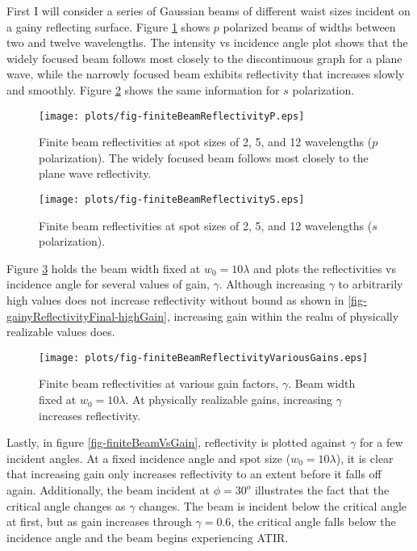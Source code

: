 \documentclass[12pt]{uthesis-v12}
\begin{document}
First I will consider a series of Gaussian beams of different waist sizes incident on a gainy reflecting surface. Figure \ref{fig-finiteBeamReflectivityP} shows $p$ polarized beams of widths between two and twelve wavelengths. The intensity vs incidence angle plot shows that the widely focused beam follows most closely to the discontinuous graph for a plane wave, while the narrowly focused beam exhibits reflectivity that increases slowly and smoothly. Figure \ref{fig-finiteBeamReflectivityS} shows the same information for $s$ polarization.

\begin{figure}[htb]
\centering
\texttt{[image: plots/fig-finiteBeamReflectivityP.eps]}
\caption[Finite Beam Reflectivities at various spot sizes ($p$-polarization)]{Finite beam reflectivities at spot sizes of 2, 5, and 12 wavelengths ($p$ polarization). The widely focused beam follows most closely to the plane wave reflectivity.
 \label{fig-finiteBeamReflectivityP}}
\end{figure}

\begin{figure}
\centering
\texttt{[image: plots/fig-finiteBeamReflectivityS.eps]}
\caption[Finite Beam Reflectivities at various spot sizes ($s$-polarization)]{Finite beam reflectivities at spot sizes of 2, 5, and 12 wavelengths ($s$ polarization).
 \label{fig-finiteBeamReflectivityS}}
\end{figure}

Figure \ref{fig-finiteBeamReflectivityVariousGains} holds the beam width fixed at $w_0=10\lambda$ and plots the reflectivities vs incidence angle for several values of gain, $\gamma$. Although increasing $\gamma$ to arbitrarily high values does not increase reflectivity without bound as shown in \ref{fig-gainyReflectivityFinal-highGain}, increasing gain within the realm of physically realizable values does.

\begin{figure}
\centering
\texttt{[image: plots/fig-finiteBeamReflectivityVariousGains.eps]}
\caption[Finite Beam Reflectivities at Various Gain Factors]{Finite beam reflectivities at various gain factors, $\gamma$. Beam width fixed at $w_0=10\lambda$. At physically realizable gains, increasing $\gamma$ increases reflectivity.
 \label{fig-finiteBeamReflectivityVariousGains}}
\end{figure}

Lastly, in figure \ref{fig-finiteBeamVsGain}, reflectivity is plotted against $\gamma$ for a few incident angles. At a fixed incidence angle and spot size ($w_0=10\lambda$), it is clear that increasing gain only increases reflectivity to an extent before it falls off again. Additionally, the beam incident at $\phi=30^o$ illustrates the fact that the critical angle changes as $\gamma$ changes. The beam is incident below the critical angle at first, but as gain increases through $\gamma=0.6$, the critical angle falls below the incidence angle and the beam begins experiencing ATIR.
\end{document}
